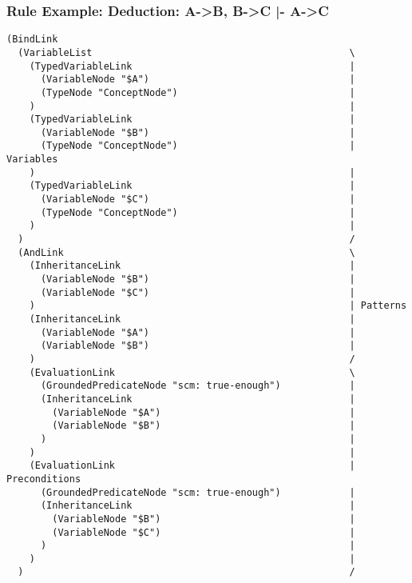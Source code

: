 \documentclass{beamer}
\begin{document}
\begin{frame}[fragile]
  \frametitle{Rule Example: Deduction: A->B, B->C |- A->C}

  {\TINY
\begin{verbatim}
(BindLink
  (VariableList                                             \
    (TypedVariableLink                                      |
      (VariableNode "$A")                                   |
      (TypeNode "ConceptNode")                              |
    )                                                       |
    (TypedVariableLink                                      |
      (VariableNode "$B")                                   |
      (TypeNode "ConceptNode")                              | Variables
    )                                                       |
    (TypedVariableLink                                      |
      (VariableNode "$C")                                   |
      (TypeNode "ConceptNode")                              |
    )                                                       |
  )                                                         /
  (AndLink                                                  \
    (InheritanceLink                                        |
      (VariableNode "$B")                                   |
      (VariableNode "$C")                                   |
    )                                                       | Patterns
    (InheritanceLink                                        |
      (VariableNode "$A")                                   |
      (VariableNode "$B")                                   |
    )                                                       /
    (EvaluationLink                                         \
      (GroundedPredicateNode "scm: true-enough")            |
      (InheritanceLink                                      |
        (VariableNode "$A")                                 |
        (VariableNode "$B")                                 |
      )                                                     |
    )                                                       |
    (EvaluationLink                                         | Preconditions
      (GroundedPredicateNode "scm: true-enough")            |
      (InheritanceLink                                      |
        (VariableNode "$B")                                 |
        (VariableNode "$C")                                 |
      )                                                     |
    )                                                       |
  )                                                         /

\end{verbatim}}
\end{frame}
\end{document}
